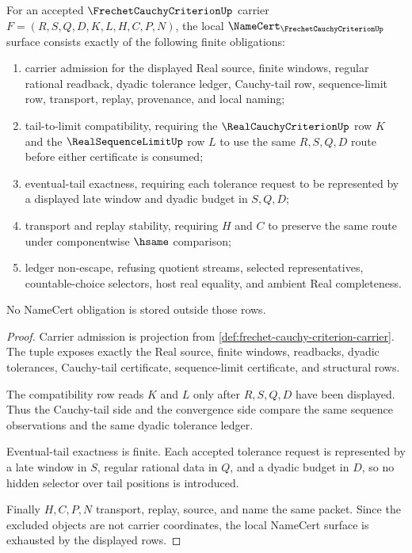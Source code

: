 \begin{theorem}
\label{thm:frechet-cauchy-criterion-namecert-obligations}
For an accepted $\FrechetCauchyCriterionUp$ carrier $F=(R,S,Q,D,K,L,H,C,P,N)$, the local $\NameCert_{\FrechetCauchyCriterionUp}$ surface consists exactly of the following finite obligations:
\begin{enumerate}
\item carrier admission for the displayed Real source, finite windows, regular rational readback, dyadic tolerance ledger, Cauchy-tail row, sequence-limit row, transport, replay, provenance, and local naming;
\item tail-to-limit compatibility, requiring the $\RealCauchyCriterionUp$ row $K$ and the $\RealSequenceLimitUp$ row $L$ to use the same $R,S,Q,D$ route before either certificate is consumed;
\item eventual-tail exactness, requiring each tolerance request to be represented by a displayed late window and dyadic budget in $S,Q,D$;
\item transport and replay stability, requiring $H$ and $C$ to preserve the same route under componentwise $\hsame$ comparison;
\item ledger non-escape, refusing quotient streams, selected representatives, countable-choice selectors, host real equality, and ambient Real completeness.
\end{enumerate}
No NameCert obligation is stored outside those rows.
\end{theorem}
\begin{proof}
Carrier admission is projection from \autoref{def:frechet-cauchy-criterion-carrier}. The tuple exposes exactly the Real source, finite windows, readbacks, dyadic tolerances, Cauchy-tail certificate, sequence-limit certificate, and structural rows.

The compatibility row reads $K$ and $L$ only after $R,S,Q,D$ have been displayed. Thus the Cauchy-tail side and the convergence side compare the same sequence observations and the same dyadic tolerance ledger.

Eventual-tail exactness is finite. Each accepted tolerance request is represented by a late window in $S$, regular rational data in $Q$, and a dyadic budget in $D$, so no hidden selector over tail positions is introduced.

Finally $H,C,P,N$ transport, replay, source, and name the same packet. Since the excluded objects are not carrier coordinates, the local NameCert surface is exhausted by the displayed rows.
\end{proof}

